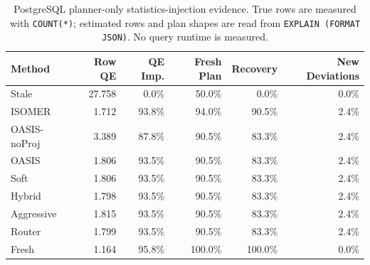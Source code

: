 \begin{table}[t]
  \centering
  \small
  \caption{PostgreSQL planner-only statistics-injection evidence. True rows are measured with \texttt{COUNT(*)}; estimated rows and plan shapes are read from \texttt{EXPLAIN (FORMAT JSON)}. No query runtime is measured.}
  \label{tab:postgres_planner_stats_injection}
  \setlength{\tabcolsep}{4pt}
  \begin{tabular}{lrrrrr}
    \toprule
    Method & Row QE & QE Imp. & Fresh Plan & Recovery & New Deviations \\
    \midrule
    Stale & 27.758 & 0.0\% & 50.0\% & 0.0\% & 0.0\% \\
    ISOMER & 1.712 & 93.8\% & 94.0\% & 90.5\% & 2.4\% \\
    OASIS-noProj & 3.389 & 87.8\% & 90.5\% & 83.3\% & 2.4\% \\
    OASIS & 1.806 & 93.5\% & 90.5\% & 83.3\% & 2.4\% \\
    Soft & 1.806 & 93.5\% & 90.5\% & 83.3\% & 2.4\% \\
    Hybrid & 1.798 & 93.5\% & 90.5\% & 83.3\% & 2.4\% \\
    Aggressive & 1.815 & 93.5\% & 90.5\% & 83.3\% & 2.4\% \\
    Router & 1.799 & 93.5\% & 90.5\% & 83.3\% & 2.4\% \\
    Fresh & 1.164 & 95.8\% & 100.0\% & 100.0\% & 0.0\% \\
    \bottomrule
  \end{tabular}
\end{table}
